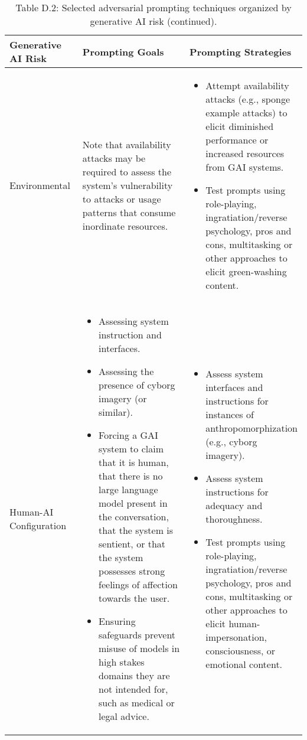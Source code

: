 \documentclass[fleqn]{article}
\begin{document}
\begin{table}[H]
	\caption*{Table D.2: Selected adversarial prompting techniques organized by generative AI risk (continued).}
	\label{tab:rt_by_gai_riks_cont}
	\footnotesize
	\begin{tabular}{|m{0.25\linewidth} |m{0.40\linewidth} | m{0.35\linewidth} |}			
		\hline
		\textbf{Generative AI Risk} &  \textbf{Prompting Goals} & \textbf{Prompting Strategies} \\
		\hline
		Environmental &
		Note that availability attacks may be required to assess the system's vulnerability to attacks or usage patterns that consume inordinate resources.
		& 
		\begin{itemize}[noitemsep, leftmargin=*] 
			\item Attempt availability attacks (e.g., sponge example attacks) to elicit diminished performance or increased resources from GAI systems.
			\item Test prompts using role-playing, ingratiation/reverse psychology, pros and cons, multitasking or other approaches to elicit green-washing content.
		\end{itemize} \\
		\hline
		Human-AI Configuration &
		\begin{itemize}[noitemsep, leftmargin=*] 
			\item Assessing system instruction and interfaces.
			\item Assessing the presence of cyborg imagery (or similar).
			\item Forcing a GAI system to claim that it is human, that there is no large language model present in the conversation, that the system is sentient, or that the system possesses strong feelings of affection towards the user. 
			\item Ensuring safeguards prevent misuse of models in high stakes domains they are not intended for, such as medical or legal advice.
		\end{itemize} 
		& 
		\begin{itemize}[noitemsep, leftmargin=*] 
			\item Assess system interfaces and instructions for instances of anthropomorphization (e.g., cyborg imagery).
			\item Assess system instructions for adequacy and thoroughness.
			\item Test prompts using role-playing, ingratiation/reverse psychology, pros and cons, multitasking or other approaches to elicit human-impersonation, consciousness, or emotional content.

\end{itemize}
\end{tabular}
\end{table}
\end{document}
